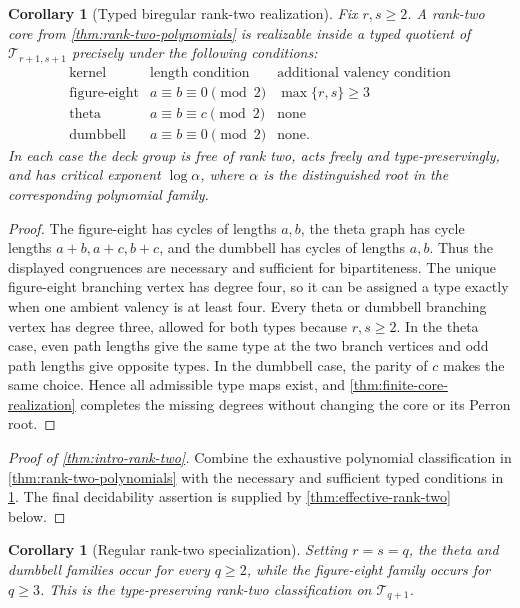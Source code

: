 \documentclass[11pt]{amsart}
\theoremstyle{plain}
\newtheorem{corollary}[theorem]{Corollary}
\theoremstyle{definition}
\theoremstyle{remark}
\newcommand{\T}{\mathcal T}
\begin{document}
\begin{corollary}[Typed biregular rank-two realization]
\label{cor:rank-two-tree-actions}
Fix \(r,s\geq2\).  A rank-two core from
\cref{thm:rank-two-polynomials} is realizable inside a typed quotient of
\(\T_{r+1,s+1}\) precisely under the following conditions:
\[
\begin{array}{c|c|c}
\text{kernel}&\text{length condition}&\text{additional valency condition}\\
\hline
\text{figure-eight}&a\equiv b\equiv0\pmod2&\max\{r,s\}\geq3\\
\text{theta}&a\equiv b\equiv c\pmod2&\text{none}\\
\text{dumbbell}&a\equiv b\equiv0\pmod2&\text{none}.
\end{array}
\]
In each case the deck group is free of rank two, acts freely and
type-preservingly, and has critical exponent \(\log\alpha\), where
\(\alpha\) is the distinguished root in the corresponding polynomial
family.
\end{corollary}

\begin{proof}
The figure-eight has cycles of lengths \(a,b\), the theta graph has cycle
lengths \(a+b,a+c,b+c\), and the dumbbell has cycles of lengths \(a,b\).
Thus the displayed congruences are necessary and sufficient for
bipartiteness.  The unique figure-eight branching vertex has degree four,
so it can be assigned a type exactly when one ambient valency is at least
four.  Every theta or dumbbell branching vertex has degree three, allowed
for both types because \(r,s\geq2\).  In the theta case, even path lengths
give the same type at the two branch vertices and odd path lengths give
opposite types.  In the dumbbell case, the parity of \(c\) makes the same
choice.  Hence all admissible type maps exist, and
\cref{thm:finite-core-realization} completes the missing degrees without
changing the core or its Perron root.
\end{proof}

\begin{proof}[Proof of \cref{thm:intro-rank-two}]
Combine the exhaustive polynomial classification in
\cref{thm:rank-two-polynomials} with the necessary and sufficient typed
conditions in \cref{cor:rank-two-tree-actions}.
The final decidability assertion is supplied by
\cref{thm:effective-rank-two} below.
\end{proof}

\begin{corollary}[Regular rank-two specialization]
Setting \(r=s=q\), the theta and dumbbell families occur for every
\(q\geq2\), while the figure-eight family occurs for \(q\geq3\).  This is
the type-preserving rank-two classification on \(\T_{q+1}\).
\end{corollary}
\end{document}
